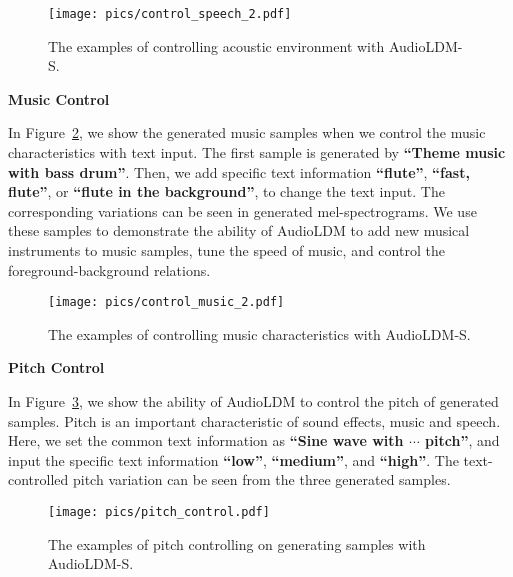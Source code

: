 \documentclass{article}
\begin{document}
\begin{figure}[H]
    \centering
    \texttt{[image: pics/control\_speech\_2.pdf]}
    \caption{The examples of controlling acoustic environment with AudioLDM-S.}
    \label{fig:demo-control-speech}
\end{figure}


\newpage

\textbf{Music Control}

In Figure~\ref{fig:demo-control-music}, we show the generated music samples when we control the music characteristics with text input. The first sample is generated by \textbf{``Theme music with bass drum''}. Then, we add specific text information \textbf{``flute''}, \textbf{``fast, flute''}, or \textbf{``flute in the background''}, to change the text input. The corresponding variations can be seen in generated mel-spectrograms. We use these samples to demonstrate the ability of AudioLDM to add new musical instruments to music samples, tune the speed of music, and control the foreground-background relations. 

\vspace{0.8cm}

\begin{figure}[H]
    \centering
    \texttt{[image: pics/control\_music\_2.pdf]}
    \caption{The examples of controlling music characteristics with AudioLDM-S.}
    \label{fig:demo-control-music}
\vspace{0.5cm}
\end{figure}

\newpage    

\textbf{Pitch Control}

In Figure~\ref{fig:pitch}, we show the ability of AudioLDM to control the pitch of generated samples. Pitch is an important characteristic of sound effects, music and speech. Here, we set the common text information as \textbf{``Sine wave with $\cdots$ pitch''}, and input the specific text information \textbf{``low''}, \textbf{``medium''}, and \textbf{``high''}. The text-controlled pitch variation can be seen from the three generated samples.

\vspace{0.5cm}


\begin{figure}[H]
    \centering
    \texttt{[image: pics/pitch\_control.pdf]}
    \caption{The examples of pitch controlling on generating samples with AudioLDM-S.}
    \label{fig:pitch}
\end{figure}
\end{document}
